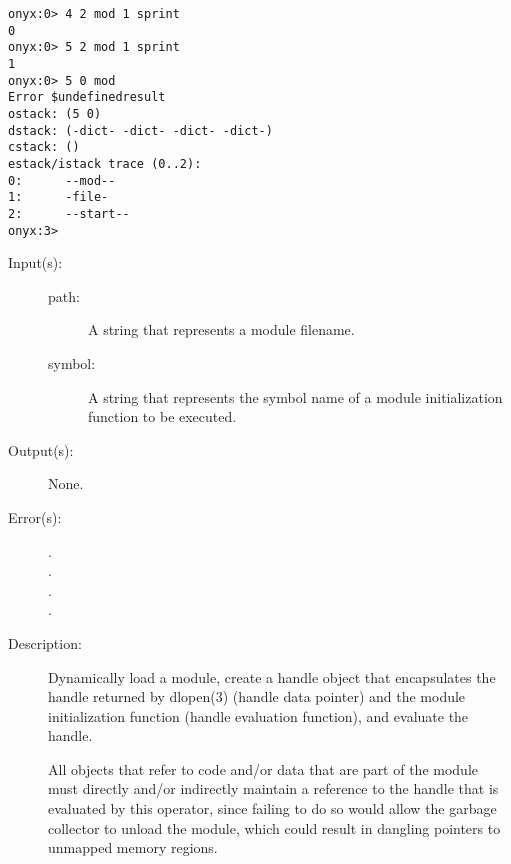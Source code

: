 \begin{description}
\begin{description}
\begin{verbatim}
onyx:0> 4 2 mod 1 sprint
0
onyx:0> 5 2 mod 1 sprint
1
onyx:0> 5 0 mod
Error $undefinedresult
ostack: (5 0)
dstack: (-dict- -dict- -dict- -dict-)
cstack: ()
estack/istack trace (0..2):
0:      --mod--
1:      -file-
2:      --start--
onyx:3>
		\end{verbatim}
	\end{description}
\label{systemdict:modload}
\item[{\onyxop{path symbol}{modload}{--}}: ]
	\begin{description}\item[]
	\item[Input(s): ]
		\begin{description}\item[]
		\item[path: ]
			A string that represents a module filename.
		\item[symbol: ]
			A string that represents the symbol name of a
			module initialization function to be executed.
		\end{description}
	\item[Output(s): ] None.
	\item[Error(s): ]
		\begin{description}\item[]
		\item[.]
		\item[.]
		\item[.]
		\item[.]
		\end{description}
	\item[Description: ]
		Dynamically load a module, create a handle object that
		encapsulates the handle returned by dlopen(3) (handle data
		pointer) and the module initialization function (handle
		evaluation function), and evaluate the handle.

		All objects that refer to code and/or data that are part of the
		module must directly and/or indirectly maintain a reference to
		the handle that is evaluated by this operator, since failing to
		do so would allow the garbage collector to unload the module,
		which could result in dangling pointers to unmapped memory
		regions.


\end{description}
\end{description}
